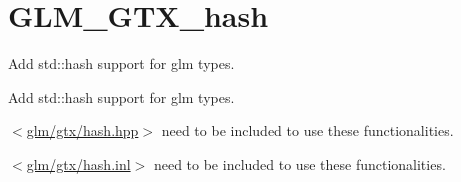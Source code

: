 \hypertarget{group__gtx__hash}{}\section{G\+L\+M\+\_\+\+G\+T\+X\+\_\+hash}
\label{group__gtx__hash}


Add std\+::hash support for glm types.  


Add std\+::hash support for glm types. 

$<$\hyperlink{hash_8hpp}{glm/gtx/hash.\+hpp}$>$ need to be included to use these functionalities.

$<$\hyperlink{hash_8inl}{glm/gtx/hash.\+inl}$>$ need to be included to use these functionalities. 